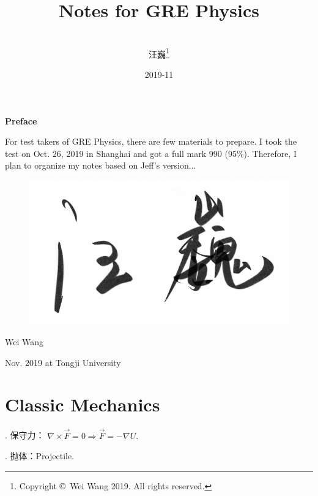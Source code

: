 \documentclass[12pt, 
]{article}
\begin{document}
\fangsong
	\title{{\bf Notes for GRE Physics}}
	\author{~\\汪巍\footnote{Copyright \copyright ~Wei Wang 2019. All rights reserved.}}
	\date{2019-11}
	\maketitle

	\thispagestyle{empty}

	
	\newpage
	\fancyfoot{\empty}
	\begin{center}
	{\large\bf Preface}
	\end{center}

		For test takers of GRE Physics, there are few materials to prepare. I took the test on Oct. 26, 2019 in Shanghai and got a full mark 990 (95\%). Therefore, I plan to organize my notes based on Jeff's version...
		~\\

		
	\begin{figure}[h]
	\vspace{2cm}
	\flushright
	\includegraphics[width=.15\textwidth]{sign.png}
	\end{figure}
	\vspace{-0.5cm}
	\hfill Wei Wang

	\hfill Nov. 2019 at Tongji University

	{
	\lhead{}
	\chead{}
	}
	
	\newpage
	\tableofcontents
	\thispagestyle{empty}%

	\newpage
	\fancyfoot[C]{\thepage}
	\setcounter{page}{1}%

	

	\lhead{}
	\chead{}
	\rhead{\leftmark}

\section{Classic Mechanics}
. 保守力：
$
	\nabla\times\vec{F}=0\Rightarrow\vec{F}=-\nabla U.
$

. 抛体：Projectile.~\\
\end{document}
